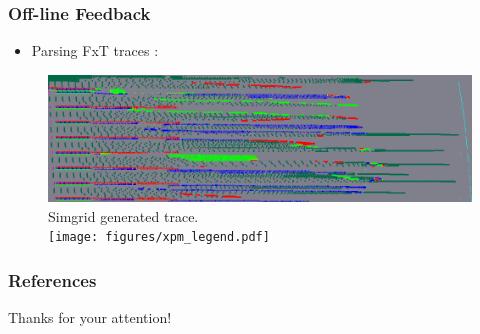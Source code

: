 \documentclass[10pt,a4paper]{beamer}
\begin{document}
\begin{frame}
\frametitle{Off-line Feedback}
\begin{itemize}
\item Parsing FxT traces :
\end{itemize}
\begin{figure}
  \center
  \includegraphics[width=1\linewidth]{figures/locality_attila_ws.png} \\
  \small{Simgrid generated trace.} \\
  \vfill
  \texttt{[image: figures/xpm\_legend.pdf]}
  \end{figure}
\end{frame}

\begin{frame}
  \frametitle{References}
\printbibliography
\end{frame}

\begin{frame}
  \Huge{\centerline{Thanks for your attention!}}
\end{frame}
\end{document}
